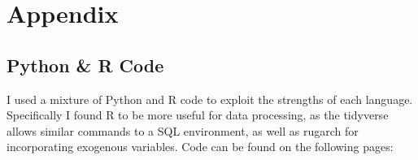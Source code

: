 \chapter*{Appendix}
\label{ch:Appendix}
\section*{Python \& R Code}
I used a mixture of Python and R code to exploit the strengths of each language. Specifically I found R to be more useful for data processing, as the tidyverse allows similar commands to a SQL environment, as well as rugarch for incorporating exogenous variables.   
Code can be found on the following pages: 
